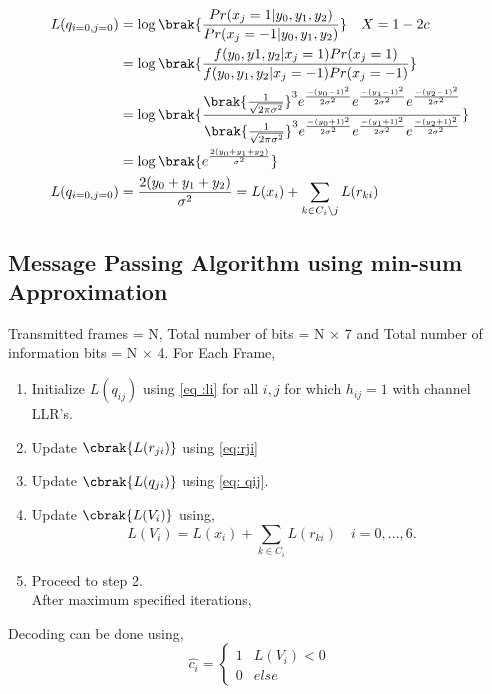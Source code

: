 \documentclass[journal,12pt,twocolumn]{IEEEtran}
\begin{document}
\begin{enumerate}
\begin{align}
L(q_{i=0,j=0})&=\log \brak{\frac{Pr(x_j=1|y_0,y_1,y_2)}{Pr(x_j=-1|y_0,y_1,y_2)}} \quad X=1-2c\\
&= \log \brak{\frac{f(y_0,y1,y_2|x_j=1)Pr(x_j=1)}{f(y_0,y_1,y_2|x_j=-1)Pr(x_j=-1)}} \\
&= \log \brak{\frac{\brak{\frac{1}{\sqrt{2\pi\sigma^2}}}^3e^{\frac{-(y_0-1)^2}{2\sigma^2}}e^{\frac{-(y_1-1)^2}{2\sigma^2}}e^{\frac{-(y_2-1)^2}{2\sigma^2}}}{\brak{\frac{1}{\sqrt{2\pi\sigma^2}}}^3e ^{\frac{-(y_0+1)^2}{2\sigma^2}}e ^{\frac{-(y_1+1)^2}{2\sigma^2}}e ^{\frac{-(y_2+1)^2}{2\sigma^2}} }  } \\
&=\log \brak{e^{\frac{2(y_0+y_1+y_2)}{\sigma^2}}} \\
L(q_{i=0,j=0})&= \frac{2(y_0+y_1+y_2)}{\sigma^2}=L(x_i)+\sum_{k \in C_i\setminus j} L(r_{ki}) \label{eq: qij}
\end{align}
\end{enumerate}

\subsection{Message Passing Algorithm using min-sum Approximation}
Transmitted frames = N, Total number of bits = N $\times$ 7 and Total number of information bits = N $\times$ 4.
For Each Frame,
\begin{enumerate}
\item Initialize $L(q_{ij})$ using \eqref{eq :li} for all $i,j$ for which $h_{ij}=1$ with channel LLR's.
\item Update $\cbrak{L(r_{ji})}$ using \eqref{eq:rji}
\item Update $\cbrak{L(q_{ji})}$ using \eqref{eq: qij}.
\item Update $\cbrak{L(V_i)}$ using,
\begin{equation}
L(V_i)=L(x_i)+\sum_{k \in C_i} L(r_{ki}) \quad i=0,\dots,6.
\end{equation}
\item Proceed to step 2.\\
After maximum specified iterations,

\end{enumerate}
Decoding can be done using,
\begin{equation}
\hat{c_i} = \begin{cases}
1 & L(V_i) < 0\\
0 & else
\end{cases}
\end{equation}
%
\end{document}
